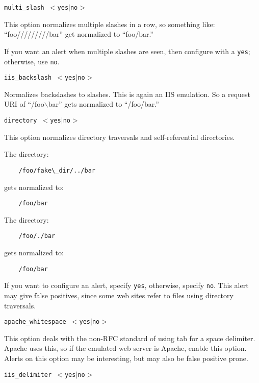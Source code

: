 \documentclass[english]{report}
\newcounter{slistnum}
\newenvironment{slist}
{ \begin{list}{ {\bf \arabic{slistnum}.} }{\usecounter{slistnum} } }
{ \end{list} }
\begin{document}
\begin{slist}
\item \texttt{multi\_slash $<$yes$|$no$>$}

This option normalizes multiple slashes in a row, so something like:
``foo/////////bar'' get normalized to ``foo/bar.''

If you want an alert when multiple slashes are seen, then configure with a
\texttt{yes}; otherwise, use \texttt{no}.

\item \texttt{iis\_backslash $<$yes$|$no$>$}

Normalizes backslashes to slashes.  This is again an IIS emulation.  So a
request URI of ``/foo$\backslash$bar'' gets normalized to ``/foo/bar.''

\item \texttt{directory $<$yes$|$no$>$}

This option normalizes directory traversals and self-referential directories.

The directory:

\begin{verbatim}
    /foo/fake\_dir/../bar
\end{verbatim}

gets normalized to:

\begin{verbatim}
    /foo/bar
\end{verbatim}

The directory:

\begin{verbatim}
    /foo/./bar
\end{verbatim}

gets normalized to:

\begin{verbatim}
    /foo/bar
\end{verbatim}

If you want to configure an alert, specify \texttt{yes}, otherwise, specify
\texttt{no}.  This alert may give false positives, since some web sites refer
to files using directory traversals.

\item \texttt{apache\_whitespace $<$yes$|$no$>$}

This option deals with the non-RFC standard of using tab for a space delimiter.
Apache uses this, so if the emulated web server is Apache, enable this option.
Alerts on this option may be interesting, but may also be false positive prone.

\item \texttt{iis\_delimiter $<$yes$|$no$>$}


\end{slist}
\end{document}
